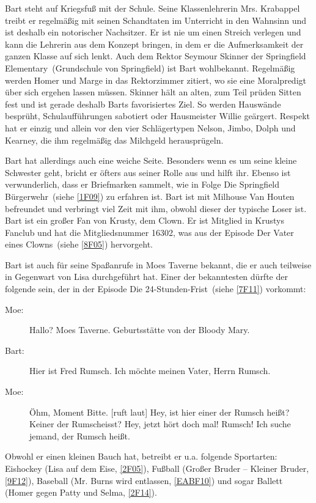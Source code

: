 Bart steht auf Kriegsfuß mit der Schule. Seine Klassenlehrerin Mrs. Krabappel treibt er regelmäßig mit seinen Schandtaten im Unterricht in den Wahnsinn und ist deshalb ein notorischer Nachsitzer. Er ist nie um einen Streich verlegen und kann die Lehrerin aus dem Konzept bringen, in dem er die Aufmerksamkeit der ganzen Klasse auf sich lenkt. Auch dem Rektor Seymour Skinner der \glqq Springfield Elementary\grqq\ (Grundschule von Springfield) ist Bart wohlbekannt. Regelmäßig werden Homer und Marge in das Rektorzimmer zitiert, wo sie eine Moralpredigt über sich ergehen lassen müssen. Skinner hält an alten, zum Teil prüden Sitten fest und ist gerade deshalb Barts favorisiertes Ziel. So werden Hauswände besprüht, Schulaufführungen sabotiert oder Hausmeister Willie geärgert. Respekt hat er einzig und allein vor den vier Schlägertypen Nelson, Jimbo, Dolph und Kearney, die ihm regelmäßig das Milchgeld herausprügeln.

Bart hat allerdings auch eine weiche Seite. Besonders wenn es um seine kleine Schwester geht, bricht er öfters aus seiner Rolle aus und hilft ihr. Ebenso ist verwunderlich, dass er Briefmarken sammelt, wie in Folge \glqq Die Springfield Bürgerwehr\grqq\ (siehe \ref{1F09}) zu erfahren ist. Bart ist mit Milhouse Van Houten befreundet und verbringt viel Zeit mit ihm, obwohl dieser der typische Loser ist. Bart ist ein großer Fan von Krusty, dem Clown. Er ist Mitglied in Krustys Fanclub und hat die Mitgliedsnummer 16302, was aus der Episode \glqq Der Vater eines Clowns\grqq\ (siehe \ref{8F05}) hervorgeht.

Bart ist auch für seine Spaßanrufe in Moes Taverne bekannt, die er auch teilweise in Gegenwart von Lisa durchgeführt hat. Einer der bekanntesten dürfte der folgende sein, der in der Episode \glqq Die 24-Stunden-Frist\grqq\ (siehe \ref{7F11}) vorkommt:

\begin{description}
	\item [Moe:] \glqq Hallo? Moes Taverne. Geburtsstätte von der Bloody Mary.\grqq
	\item [Bart:] \glqq Hier ist Fred Rumsch. Ich möchte meinen Vater, Herrn Rumsch.\grqq
	\item [Moe:] \glqq Öhm, Moment Bitte. [ruft laut] Hey, ist hier einer der Rumsch heißt? Keiner der \glq Rumscheisst\grq ? Hey, jetzt hört doch mal! Rumsch! Ich suche jemand, der Rumsch heißt.\grqq
\end{description}

Obwohl er einen kleinen Bauch hat, betreibt er u.a. folgende Sportarten: Eishockey (\glqq Lisa auf dem Eise\grqq , \ref{2F05}), Fußball (\glqq Großer Bruder -- Kleiner Bruder\grqq , \ref{9F12}), Baseball (\glqq Mr. Burns wird entlassen\grqq , \ref{EABF10}) und sogar Ballett (\glqq Homer gegen Patty und Selma\grqq , \ref{2F14}).

